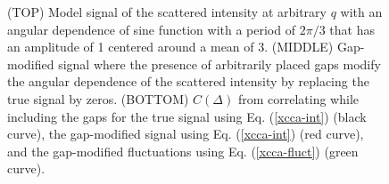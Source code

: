 \documentclass[12pt]{article}
\begin{document}
\begin{figure}
  \centering
  \caption{ \small (TOP) Model signal of the scattered intensity at arbitrary $q$ with an angular dependence of sine function with a period of $2\pi/3$ that has an amplitude of 1 centered around a mean of 3. (MIDDLE) Gap-modified signal where the presence of arbitrarily placed gaps modify the angular dependence of the scattered intensity by replacing the true signal by zeros. (BOTTOM) $C(\Delta)$ from correlating while including the gaps for the true signal using Eq. (\ref{xcca-int}) (black curve), the gap-modified signal using Eq. (\ref{xcca-int}) (red curve), and the gap-modified fluctuations using Eq. (\ref{xcca-fluct}) (green curve).}
  \label{fig-include-gaps}
\end{figure}
\end{document}
